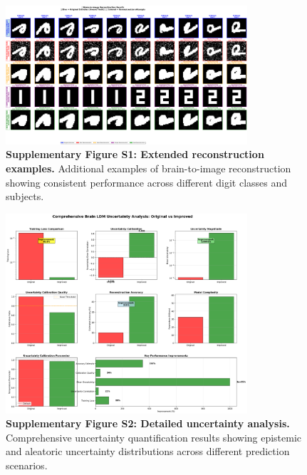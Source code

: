 \documentclass[11pt,a4paper]{article}
\begin{document}
\begin{figure}[H]
\centering
\includegraphics[width=0.8\textwidth]{../figures/Fig1_reconstruction_results.png}
\caption{\textbf{Supplementary Figure S1: Extended reconstruction examples.} Additional examples of brain-to-image reconstruction showing consistent performance across different digit classes and subjects.}
\end{figure}

\begin{figure}[H]
\centering
\includegraphics[width=0.8\textwidth]{../figures/Fig2_uncertainty_analysis.png}
\caption{\textbf{Supplementary Figure S2: Detailed uncertainty analysis.} Comprehensive uncertainty quantification results showing epistemic and aleatoric uncertainty distributions across different prediction scenarios.}
\end{figure}
\end{document}
